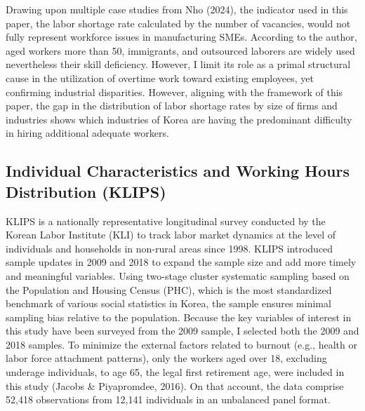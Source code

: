 \documentclass[
  12pt,
]{article}
\begin{document}
Drawing upon multiple case studies from Nho (2024), the indicator used
in this paper, the labor shortage rate calculated by the number of
vacancies, would not fully represent workforce issues in manufacturing
SMEs. According to the author, aged workers more than 50, immigrants,
and outsourced laborers are widely used nevertheless their skill
deficiency. However, I limit its role as a primal structural cause in
the utilization of overtime work toward existing employees, yet
confirming industrial disparities. However, aligning with the framework
of this paper, the gap in the distribution of labor shortage rates by
size of firms and industries shows which industries of Korea are having
the predominant difficulty in hiring additional adequate workers.

\subsection{Individual Characteristics and Working Hours Distribution
(KLIPS)}\label{individual-characteristics-and-working-hours-distribution-klips}

KLIPS is a nationally representative longitudinal survey conducted by
the Korean Labor Institute (KLI) to track labor market dynamics at the
level of individuals and households in non-rural areas since 1998. KLIPS
introduced sample updates in 2009 and 2018 to expand the sample size and
add more timely and meaningful variables. Using two-stage cluster
systematic sampling based on the Population and Housing Census (PHC),
which is the most standardized benchmark of various social statistics in
Korea, the sample ensures minimal sampling bias relative to the
population. Because the key variables of interest in this study have
been surveyed from the 2009 sample, I selected both the 2009 and 2018
samples. To minimize the external factors related to burnout (e.g.,
health or labor force attachment patterns), only the workers aged over
18, excluding underage individuals, to age 65, the legal first
retirement age, were included in this study (Jacobs \& Piyapromdee,
2016). On that account, the data comprise 52,418 observations from
12,141 individuals in an unbalanced panel format.
\end{document}
